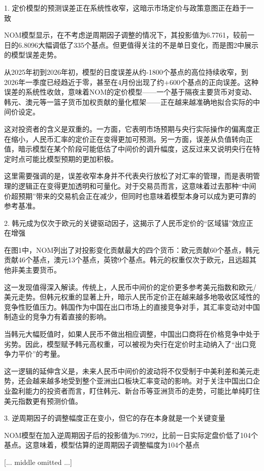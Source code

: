 \documentclass[11pt]{ctexart}
\begin{document}
1. 定价模型的预测误差正在系统性收窄，这暗示市场定价与政策意图正在趋于一致

NOM模型显示，在不考虑逆周期因子调整的情况下，其投影值为6.7761，较前一日的6.8096大幅调低了335个基点。但更值得关注的不是单日变化，而是图2中展示的模型误差走势。

从2025年初到2026年初，模型的日度误差从约-1800个基点的高位持续收窄，到2026年一季度已经趋近于零，甚至在4月份出现了约+600个基点的正向误差。这种误差的系统性收敛，意味着NOM的定价模型——一个基于隔夜主要货币对变动、韩元、澳元等一篮子货币加权贡献的量化框架——正在越来越准确地拟合实际的中间价设定。

这对投资者的含义是双重的。一方面，它表明市场预期与央行实际操作的偏离度正在缩小，人民币汇率的定价正在变得更加可预测。另一方面，误差从负值转向正值，暗示模型在某个阶段可能低估了中间价的调升幅度，这反过来又说明央行在特定时点可能比模型预期的更加积极。

这里需要强调的是，误差收窄本身并不代表央行放松了对汇率的管理，而是表明管理的逻辑正在变得更加透明和可量化。对于交易员而言，这意味着过去那种“中间价超预期”带来的交易机会正在减少，但同时也意味着模型本身可以成为更可靠的参考基准。

2. 韩元成为仅次于欧元的关键驱动因子，这揭示了人民币定价的“区域锚”效应正在增强

在图1中，NOM列出了对投影变化贡献最大的四个货币：欧元贡献60个基点，韩元贡献46个基点，澳元13个基点，英镑9个基点。韩元的权重仅次于欧元，且远超其他非美主要货币。

这一发现值得深入解读。传统上，人民币中间价的定价更多参考美元指数和欧元/美元走势。但韩元权重的显著上升，暗示人民币定价正在越来越多地吸收区域性的竞争性贬值压力。韩国作为中国在出口市场上的直接竞争对手，其汇率变动对中国制造业的竞争力有着直接的影响。

当韩元大幅贬值时，如果人民币不做出相应调整，中国出口商将在价格竞争中处于劣势。因此，模型赋予韩元高权重，可以被视为央行在定价时主动纳入了“出口竞争力平价”的考量。

这一逻辑的延伸含义是，未来人民币中间价的波动将不仅受制于中美利差和美元走势，还会越来越多地受到整个亚洲出口板块汇率变动的影响。对于关注中国出口企业盈利能力的投资者而言，盯住韩元、新台币等亚洲货币的走势，可能比单纯盯住美元指数更有预测价值。

3. 逆周期因子的调整幅度正在变小，但它的存在本身就是一个关键变量

NOM模型在加入逆周期因子后的投影值为6.7992，比前一日实际定盘价低了104个基点。这意味着，模型估算的逆周期因子调整幅度为104个基点

[... middle omitted ...]
\end{document}
